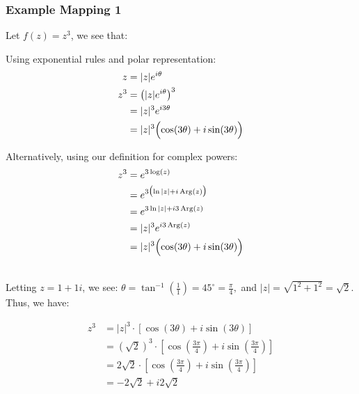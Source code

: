 \documentclass[a4paper,12pt]{article} %
\theoremstyle{definition}
\theoremstyle{plain}
\begin{document}
\subsubsection{Example Mapping 1}
Let \( f(z) = z^3 \), we see that: \\[1ex]
\begin{minipage}{0.47\textwidth}
  Using exponential rules and polar representation:
  \begin{align*}
    z   & = |z|e^{i\theta}                                   \\
    z^3 & = \bigl(|z|e^{i\theta}\bigr)^3                     \\
        & = |z|^3 e^{i3\theta}                               \\
        & = |z|^3 \Bigl(\cos(3\theta) + i\sin(3\theta)\Bigr)
  \end{align*}
\end{minipage}\hfill
\begin{minipage}{0.47\textwidth}
  Alternatively, using our definition for complex powers:
  \begin{align*}
    z^3 & = e^{3\log(z)}                                     \\
        & = e^{3\bigl(\ln|z| + i\,\mathrm{Arg}(z)\bigr)}     \\
        & = e^{3\ln|z| + i3\,\mathrm{Arg}(z)}                \\
        & = |z|^3 e^{i3\,\mathrm{Arg}(z)}                    \\
        & = |z|^3 \Bigl(\cos(3\theta) + i\sin(3\theta)\Bigr)
  \end{align*}
\end{minipage}\hfill\\[1ex]
Letting $z = 1 + 1i$, we see:
$\theta = \tan^{-1}\left(\frac{1}{1}\right) = 45^\circ = \frac{\pi}{4},$
and $|z| = \sqrt{1^2 + 1^2} = \sqrt{2}$.  Thus, we have: \\
\begin{minipage}{0.47\textwidth}
  \begin{align*}
    z^3 & = |z|^3\cdot \left[\cos(3\theta) + i\sin(3\theta)\right]                                            \\
        & = (\sqrt{2})^3\cdot \left[\cos\left(\frac{3\pi}{4}\right) + i\sin\left(\frac{3\pi}{4}\right)\right] \\
        & = 2\sqrt{2}\cdot \left[\cos\left(\frac{3\pi}{4}\right) + i\sin\left(\frac{3\pi}{4}\right)\right]    \\
        & = -2\sqrt{2} + i 2\sqrt{2}
  \end{align*}
\end{minipage}\hfill
\end{document}
